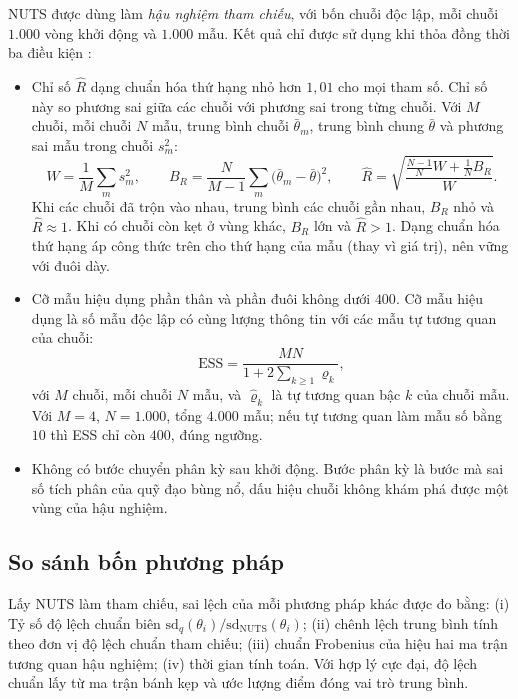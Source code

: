 \documentclass[12pt,a4paper]{article}
\theoremstyle{definition}
\theoremstyle{remark}
\begin{document}
NUTS được dùng làm \emph{hậu nghiệm tham chiếu}, với bốn chuỗi độc lập, mỗi chuỗi $1.000$ vòng khởi động và $1.000$ mẫu. Kết quả chỉ được sử dụng khi thỏa đồng thời ba điều kiện \cite{vehtari2021}:
\begin{itemize}
\item Chỉ số $\hat R$ dạng chuẩn hóa thứ hạng nhỏ hơn $1{,}01$ cho mọi tham số. Chỉ số này so phương sai giữa các chuỗi với phương sai trong từng chuỗi. Với $M$ chuỗi, mỗi chuỗi $N$ mẫu, trung bình chuỗi $\bar\theta_m$, trung bình chung $\bar\theta$ và phương sai mẫu trong chuỗi $s_m^2$:
\begin{equation*}
W=\frac1M\sum_{m}s_m^2,\qquad
B_R=\frac{N}{M-1}\sum_{m}\big(\bar\theta_m-\bar\theta\big)^2,\qquad
\hat R=\sqrt{\frac{\frac{N-1}{N}W+\frac1N B_R}{W}} .
\end{equation*}
Khi các chuỗi đã trộn vào nhau, trung bình các chuỗi gần nhau, $B_R$ nhỏ và $\hat R\approx1$. Khi có chuỗi còn kẹt ở vùng khác, $B_R$ lớn và $\hat R>1$. Dạng chuẩn hóa thứ hạng áp công thức trên cho thứ hạng của mẫu (thay vì giá trị), nên vững với đuôi dày.
\item Cỡ mẫu hiệu dụng phần thân và phần đuôi không dưới $400$. Cỡ mẫu hiệu dụng là số mẫu độc lập có cùng lượng thông tin với các mẫu tự tương quan của chuỗi:
\begin{equation*}
\mathrm{ESS}=\frac{MN}{1+2\sum_{k\ge1}\hat\varrho_k},
\end{equation*}
với $M$ chuỗi, mỗi chuỗi $N$ mẫu, và $\hat\varrho_k$ là tự tương quan bậc $k$ của chuỗi mẫu. Với $M=4$, $N=1.000$, tổng $4.000$ mẫu; nếu tự tương quan làm mẫu số bằng $10$ thì ESS chỉ còn $400$, đúng ngưỡng.
\item Không có bước chuyển phân kỳ sau khởi động. Bước phân kỳ là bước mà sai số tích phân của quỹ đạo bùng nổ, dấu hiệu chuỗi không khám phá được một vùng của hậu nghiệm.
\end{itemize}

\subsection{So sánh bốn phương pháp}

Lấy NUTS làm tham chiếu, sai lệch của mỗi phương pháp khác được đo bằng: (i) Tỷ số độ lệch chuẩn biên $\mathrm{sd}_q(\theta_i)/\mathrm{sd}_{\mathrm{NUTS}}(\theta_i)$; (ii) chênh lệch trung bình tính theo đơn vị độ lệch chuẩn tham chiếu; (iii) chuẩn Frobenius của hiệu hai ma trận tương quan hậu nghiệm; (iv) thời gian tính toán. Với hợp lý cực đại, độ lệch chuẩn lấy từ ma trận bánh kẹp và ước lượng điểm đóng vai trò trung bình.
\end{document}

